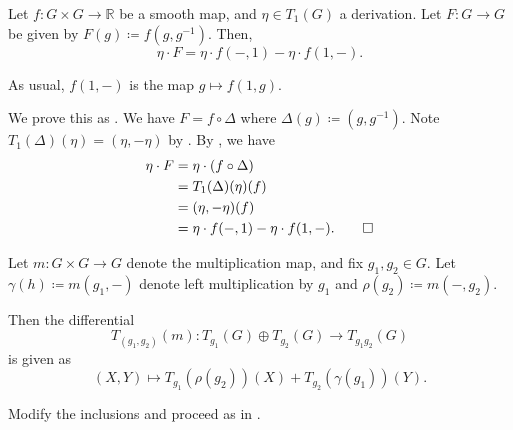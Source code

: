 \documentclass[12pt]{article}
\begin{document}
\begin{cor}
	Let $f \colon G \times G \to \mathbb{R}$ be a smooth map, and $\eta \in T_{1}(G)$ a derivation. 
	Let $F \colon G \to G$ be given by $F(g) \coloneqq f(g, g^{-1})$. 
	Then,
	\begin{equation*} 
		\eta \cdot F = \eta \cdot f(-, 1) - \eta \cdot f(1, -).
	\end{equation*}
\end{cor}
As usual, $f(1, -)$ is the map $g \mapsto f(1, g)$.
\begin{sketch}
	We prove this as . 
	We have $F = f \circ \Delta$ where $\Delta(g) \coloneqq (g, g^{-1})$. 
	Note $T_{1}(\Delta)(\eta) = (\eta, -\eta)$ by . 
	By , we have
	\begin{align*} 
		\eta \cdot F &= \eta \cdot (f \circ \Delta) \\
		&= T_{1}(\Delta)(\eta)(f) \\
		&= (\eta, -\eta)(f) \\
		&= \eta \cdot f(-, 1) - \eta \cdot f(1, -). \qedhere
	\end{align*}
\end{sketch}

\begin{exe} \label{exe:differential-multiplication-at-different-points}
	Let $m \colon G \times G \to G$ denote the multiplication map, and fix $g_{1}, g_{2} \in G$. 
	Let $\gamma(h) \coloneqq m(g_{1}, -)$ denote left multiplication by $g_{1}$ and $\rho(g_{2}) \coloneqq m(-, g_{2})$. 

	Then the differential
	\begin{equation*} 
		T_{(g_{1}, g_{2})}(m) \colon T_{g_{1}}(G) \oplus T_{g_{2}}(G) \to T_{g_{1} g_{2}}(G)
	\end{equation*}
	is given as
	\begin{equation*} 
		(X, Y) \mapsto T_{g_{1}}(\rho(g_{2}))(X) + T_{g_{2}}(\gamma(g_{1}))(Y).
	\end{equation*}
\end{exe}
\begin{sketch}
	Modify the inclusions and proceed as in .
\end{sketch}
\end{document}
